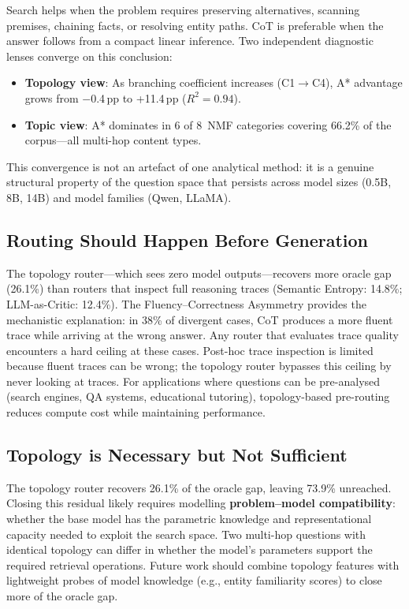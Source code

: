 \documentclass{article}
\newcommand{\pp}{\,pp\xspace}
\begin{document}
Search helps when the problem requires preserving alternatives, scanning
premises, chaining facts, or resolving entity paths.  CoT is preferable when
the answer follows from a compact linear inference.  Two independent
diagnostic lenses converge on this conclusion:
\begin{itemize}[leftmargin=1.5em,itemsep=2pt]
\item \textbf{Topology view}: As branching coefficient increases
  (C1$\rightarrow$C4), A* advantage grows from $-$0.4\pp to +11.4\pp
  ($R^2{=}0.94$).
\item \textbf{Topic view}: A* dominates in 6 of 8~NMF categories covering
  66.2\% of the corpus---all multi-hop content types.
\end{itemize}
This convergence is not an artefact of one analytical method: it is a genuine
structural property of the question space that persists across model sizes
(0.5B, 8B, 14B) and model families (Qwen, LLaMA).

\subsection{Routing Should Happen Before Generation}

The topology router---which sees zero model outputs---recovers more oracle gap
(26.1\%) than routers that inspect full reasoning traces (Semantic Entropy:
14.8\%; LLM-as-Critic: 12.4\%).  The Fluency--Correctness Asymmetry provides
the mechanistic explanation: in 38\% of divergent cases, CoT produces a more
fluent trace while arriving at the wrong answer.  Any router that evaluates
trace quality encounters a hard ceiling at these cases.  Post-hoc trace
inspection is limited because fluent traces can be wrong; the topology router
bypasses this ceiling by never looking at traces.  For applications where
questions can be pre-analysed (search engines, QA systems, educational
tutoring), topology-based pre-routing reduces compute cost while maintaining
performance.

\subsection{Topology is Necessary but Not Sufficient}

The topology router recovers 26.1\% of the oracle gap, leaving 73.9\%
unreached.  Closing this residual likely requires modelling
\textbf{problem--model compatibility}: whether the base model has the
parametric knowledge and representational capacity needed to exploit the search
space.  Two multi-hop questions with identical topology can differ in whether
the model's parameters support the required retrieval operations.  Future work
should combine topology features with lightweight probes of model knowledge
(e.g., entity familiarity scores) to close more of the oracle gap.
\end{document}
